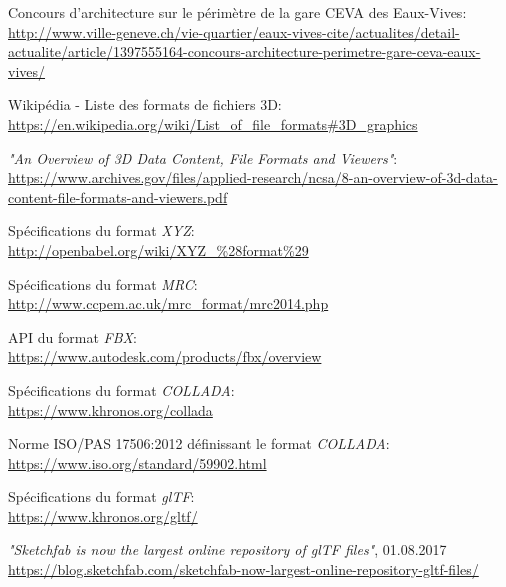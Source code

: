 


\begin{thebibliography}{9}

\footnotesize

 Concours d’architecture sur le périmètre de la gare CEVA des Eaux-Vives: \\
\url{http://www.ville-geneve.ch/vie-quartier/eaux-vives-cite/actualites/detail-actualite/article/1397555164-concours-architecture-perimetre-gare-ceva-eaux-vives/}

 Wikipédia - Liste des formats de fichiers 3D: \\
\url{https://en.wikipedia.org/wiki/List_of_file_formats\#3D_graphics}

 \textit{"An Overview of 3D Data Content, File Formats and Viewers"}: \\
\url{https://www.archives.gov/files/applied-research/ncsa/8-an-overview-of-3d-data-content-file-formats-and-viewers.pdf}

 Spécifications du format \textit{XYZ}: \\ \url{http://openbabel.org/wiki/XYZ_\%28format\%29}

 Spécifications du format \textit{MRC}: \\ \url{http://www.ccpem.ac.uk/mrc_format/mrc2014.php}

 API du format \textit{FBX}: \\
\url{https://www.autodesk.com/products/fbx/overview}

 Spécifications du format \textit{COLLADA}: \\
\url{https://www.khronos.org/collada}

 Norme ISO/PAS 17506:2012 définissant le format \textit{COLLADA}: \\
\url{https://www.iso.org/standard/59902.html}

 Spécifications du format \textit{glTF}: \\
\url{https://www.khronos.org/gltf/}

 \textit{"Sketchfab is now the largest online repository of glTF files"}, 01.08.2017  \\
\url{https://blog.sketchfab.com/sketchfab-now-largest-online-repository-gltf-files/}


\end{thebibliography}

